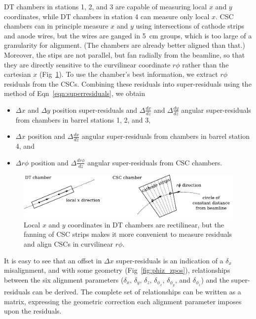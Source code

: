\documentclass[12pt]{article}
\begin{document}
DT chambers in stations 1, 2, and 3 are capable of measuring local $x$
and $y$ coordinates, while DT chambers in station 4 can measure only
local $x$.  CSC chambers can in principle measure $x$ and $y$ using
intersections of cathode strips and anode wires, but the wires are
ganged in 5~cm groups, which is too large of a granularity for
alignment.  (The chambers are already better aligned than that.)
Moreover, the stips are not parallel, but fan radially from the
beamline, so that they are directly sensitive to the curvilinear
coordinate $r\phi$ rather than the cartesian $x$
(Fig~\ref{fig:csc_localrphi}).  To use the chamber's best information,
we extract $r\phi$ residuals from the CSCs.  Combining these residuals
into super-residuals using the method of Eqn~\ref{eqn:superresiduals},
we obtain
\begin{itemize}
\item $\Delta x$ and $\Delta y$ position super-residuals and $\Delta
  \frac{dx}{dz}$ and $\Delta \frac{dy}{dz}$ angular super-residuals
  from chambers in barrel stations 1, 2, and 3,
\item $\Delta x$ position and $\Delta \frac{dx}{dz}$ angular
  super-residuals from chambers in barrel station 4, and
\item $\Delta r\phi$ position and $\Delta \frac{dr\phi}{dz}$ angular
  super-residuals from CSC chambers.
\end{itemize}

\begin{figure}
\begin{center} \includegraphics{strip_direction.pdf} \end{center}
\caption{Local $x$ and $y$ coordinates in DT chambers are rectilinear, but the fanning of CSC strips makes it more convenient to measure residuals and align CSCs in curvilinear $r\phi$. \label{fig:csc_localrphi}}
\end{figure}

It is easy to see that an offset in $\Delta x$ super-residuals is an
indication of a $\delta_x$ misalignment, and with some geometry
(Fig~\ref{fig:phiz_zpos}), relationships between the six alignment
parameters ($\delta_x$, $\delta_y$, $\delta_z$, $\delta_{\phi_x}$,
$\delta_{\phi_y}$, and $\delta_{\phi_z}$) and the super-residuals can
be derived.  The complete set of relationships can be written as a
matrix, expressing the geometric correction each alignment parameter
imposes upon the residuals.
\end{document}
